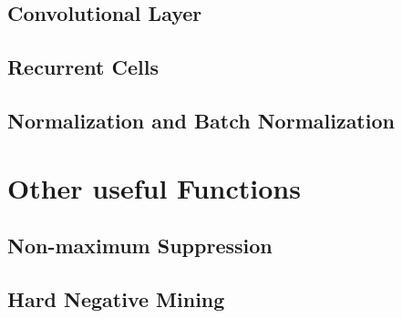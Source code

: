 \subsection{Convolutional Layer}
\subsection{Recurrent Cells}
\subsection{Normalization and Batch Normalization}

\section{Other useful Functions}
\subsection{Non-maximum Suppression}
\subsection{Hard Negative Mining}
